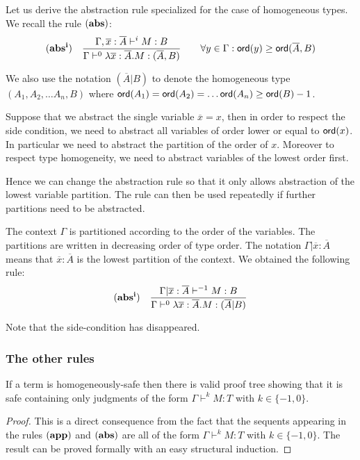 Let us derive the abstraction rule specialized for the case of
homogeneous types. We recall the rule $\mathbf{(abs)}$:
$$ \mathbf{(abs^i)} \quad  \frac{\displaystyle \Gamma, \overline{x} : \overline{A} \vdash^{i} M : B}{\Gamma  \vdash^{0} \lambda \overline{x} : \overline{A} . M : (\overline{A},B)} \qquad
                                   \forall y \in \Gamma : {\sf ord}(y) \geq {\sf ord}(\overline{A},B)$$

We also use the notation $(\overline{A}|B)$ to denote the
homogeneous type $(A_1, A_2, \ldots A_n, B)$ where ${\sf ord}(A_1) =
{\sf ord}(A_2) =  \ldots {\sf ord}(A_n) \geq {\sf ord}(B) -1$.


Suppose that we abstract the single variable $\overline{x} = x$,
then in order to respect the side condition, we need to abstract all
variables of order lower or equal to ${\sf ord}(x)$. In particular we
need to abstract the partition of the order of $x$. Moreover to
respect type homogeneity, we need to abstract variables of the
lowest order first.

Hence we can change the abstraction rule so that it only allows
abstraction of the lowest variable partition. The rule can then be
used repeatedly if further partitions need to be abstracted.

The context $\Gamma$ is partitioned according to the order of the
variables. The partitions are written in decreasing order of type
order. The notation $\Gamma | \overline{x}:\overline{A}$ means that
$\overline{x}:\overline{A}$ is the lowest partition of the context.
We obtained the following rule:
$$ \mathbf{(abs^i)} \quad  \frac{\displaystyle \Gamma| \overline{x} : \overline{A} \vdash^{-1} M : B}{\Gamma  \vdash^{0} \lambda \overline{x} : \overline{A} . M : (\overline{A}|B)}$$

Note that the side-condition has disappeared.

\subsubsection{The other rules}

\begin{lem}
If a term is homogeneously-safe then there is valid proof tree
showing that it is safe containing only judgments of the form
$\Gamma \vdash^{k} M : T$ with $k\in \{-1,0\}$.
\end{lem}

\begin{proof}
This is a direct consequence from the fact that the sequents
appearing in the rules $\mathbf{(app)}$ and $\mathbf{(abs)}$ are all
of the form $\Gamma \vdash^{k} M : T$ with $k\in \{-1,0\}$. The
result can be proved formally with an easy structural induction.
\end{proof}

